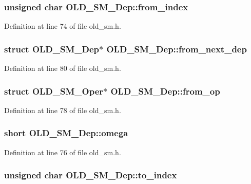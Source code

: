 \subsubsection{\setlength{\rightskip}{0pt plus 5cm}unsigned char \bf{OLD\_\-SM\_\-Dep::from\_\-index}}\label{structOLD__SM__Dep_0e2e67609151b820737a32645b042dc3}




Definition at line 74 of file old\_\-sm.h.
\subsubsection{\setlength{\rightskip}{0pt plus 5cm}struct \bf{OLD\_\-SM\_\-Dep}$\ast$ \bf{OLD\_\-SM\_\-Dep::from\_\-next\_\-dep}}\label{structOLD__SM__Dep_a53a00343562302b46b210af867c188b}




Definition at line 80 of file old\_\-sm.h.
\subsubsection{\setlength{\rightskip}{0pt plus 5cm}struct \bf{OLD\_\-SM\_\-Oper}$\ast$ \bf{OLD\_\-SM\_\-Dep::from\_\-op}}\label{structOLD__SM__Dep_080ae1717be94e47f7e1eaa27d3e9ec1}




Definition at line 78 of file old\_\-sm.h.
\subsubsection{\setlength{\rightskip}{0pt plus 5cm}short \bf{OLD\_\-SM\_\-Dep::omega}}\label{structOLD__SM__Dep_282076c360df01837495404d4278bfa4}




Definition at line 76 of file old\_\-sm.h.
\subsubsection{\setlength{\rightskip}{0pt plus 5cm}unsigned char \bf{OLD\_\-SM\_\-Dep::to\_\-index}}\label{structOLD__SM__Dep_86aba489952a26411b1a649ebe8e889d}




